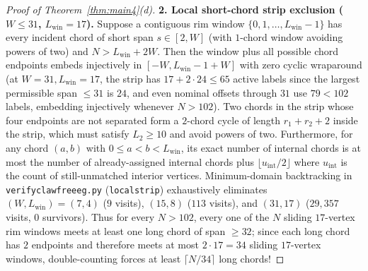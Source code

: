 \documentclass[11pt,reqno]{amsart}
\theoremstyle{plain}
\theoremstyle{definition}
\theoremstyle{remark}
\DeclareRobustCommand{\_}{\ifmmode\text{\textunderscore}\else\textunderscore\allowbreak\fi}
\begin{document}
\begin{proof}[Proof of Theorem~\ref{thm:main4}(d)]
\medskip
\noindent\textbf{2. Local short-chord strip exclusion ($W \le 31$, $L_{\mathrm{win}} = 17$).}
Suppose a contiguous rim window $\{0, 1, \dots, L_{\mathrm{win}} - 1\}$ has every incident chord of short span $s \in [2, W]$ (with $1$-chord window avoiding powers of two) and $N > L_{\mathrm{win}} + 2W$. Then the window plus all possible chord endpoints embeds injectively in $[-W, L_{\mathrm{win}} - 1 + W]$ with zero cyclic wraparound (at $W = 31, L_{\mathrm{win}} = 17$, the strip has $17 + 2 \cdot 24 \le 65$ active labels since the largest permissible span $\le 31$ is $24$, and even nominal offsets through $31$ use $79 < 102$ labels, embedding injectively whenever $N > 102$). Two chords in the strip whose four endpoints are not separated form a $2$-chord cycle of length $r_1 + r_2 + 2$ inside the strip, which must satisfy $L_2 \ge 10$ and avoid powers of two. Furthermore, for any chord $(a, b)$ with $0 \le a < b < L_{\mathrm{win}}$, its exact number of internal chords is at most the number of already-assigned internal chords plus $\lfloor u_{\mathrm{int}}/2 \rfloor$ where $u_{\mathrm{int}}$ is the count of still-unmatched interior vertices. Minimum-domain backtracking in \texttt{verify\_clawfree\_eg.py} (\texttt{local\_strip}) exhaustively eliminates $(W, L_{\mathrm{win}}) = (7, 4)$ ($9$ visits), $(15, 8)$ ($113$ visits), and $(31, 17)$ ($29{,}357$ visits, $0$ survivors). Thus for every $N > 102$, every one of the $N$ sliding $17$-vertex rim windows meets at least one long chord of span $\ge 32$; since each long chord has $2$ endpoints and therefore meets at most $2 \cdot 17 = 34$ sliding $17$-vertex windows, double-counting forces at least $\lceil N/34 \rceil$ long chords!


\end{proof}
\end{document}
